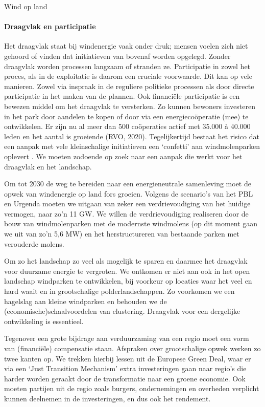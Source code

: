 \begin{voorstel}{Wind op land}
\begin{multicols}{2}
\begin{overwegingen}
\paragraph{Draagvlak en participatie}
Het draagvlak staat bij windenergie vaak onder druk; mensen voelen zich niet gehoord of vinden dat initiatieven van bovenaf worden opgelegd. Zonder draagvlak worden processen langzaam of stranden ze. Participatie in zowel het proces, als in de exploitatie is daarom een cruciale voorwaarde. Dit kan op vele manieren. Zowel via inspraak in de reguliere politieke processen als door directe participatie in het maken van de plannen. Ook financiële participatie is een bewezen middel om het draagvlak te versterken. Zo kunnen bewoners investeren in het park door aandelen te kopen of door via een energiecoöperatie (mee) te ontwikkelen. Er zijn nu al meer dan 500 coöperaties actief met 35.000 à 40.000 leden en het aantal is groeiende (RVO, 2020). Tegelijkertijd bestaat het risico dat een aanpak met vele kleinschalige initiatieven een ‘confetti’ aan windmolenparken oplevert \parencite{college_van_rijksadviseurs_via_2019}. We moeten zodoende op zoek naar een aanpak die werkt voor het draagvlak en het landschap.
\end{overwegingen}

\begin{aanbevelingen}
Om tot 2030 de weg te bereiden naar een energieneutrale samenleving moet de opwek van windenergie op land fors groeien. Volgens de scenario’s van het PBL en Urgenda moeten we uitgaan van zeker een verdrievoudiging van het huidige vermogen, naar zo’n 11 GW. We willen de verdrievoudiging realiseren door de bouw van windmolenparken met de modernste windmolens (op dit moment gaan we uit van zo’n 5,6 MW) en het herstructureren van bestaande parken met verouderde molens.

Om zo het landschap zo veel als mogelijk te sparen en daarmee het draagvlak voor duurzame energie te vergroten. We ontkomen er niet aan ook in het open landschap windparken te ontwikkelen, bij voorkeur op locaties waar het veel en hard waait en in grootschalige polderlandschappen. Zo voorkomen we een hagelslag aan kleine windparken en behouden we de (economische)schaalvoordelen van clustering. Draagvlak voor een dergelijke ontwikkeling is essentieel.

Tegenover een grote bijdrage aan verduurzaming van een regio moet een vorm van (financiële) compensatie staan. Afspraken over grootschalige opwek werken zo twee kanten op. We trekken hierbij lessen uit de Europese Green Deal, waar er via een ‘Just Transition Mechanism’ extra investeringen gaan naar regio’s die harder worden geraakt door de transformatie naar een groene economie. Ook moeten partijen uit de regio zoals burgers, ondernemingen en overheden verplicht kunnen deelnemen in de investeringen, en dus ook het rendement.


\end{aanbevelingen}
\end{multicols}
\end{voorstel}
